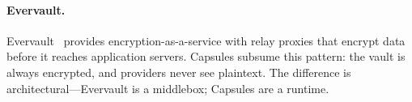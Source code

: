 \paragraph{Evervault.}
Evervault~\cite{evervault2022} provides encryption-as-a-service with relay
proxies that encrypt data before it reaches application servers. Capsules
subsume this pattern: the vault is always encrypted, and providers never see
plaintext. The difference is architectural---Evervault is a middlebox;
Capsules are a runtime.

